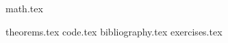 \usepackage{fullpage}

\usepackage[english]{babel}
\usepackage{enumitem}
\usepackage{tikz}
\usetikzlibrary{arrows.meta,calc}

{math.tex}


\usepackage{amsthm,mdframed}
\usepackage[hidelinks,hypertexnames=false]{hyperref}
\usepackage[nameinlink]{cleveref}

{theorems.tex}
{code.tex}
{bibliography.tex}
{exercises.tex}

\usepackage{csquotes}
